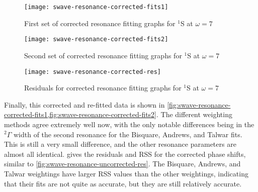 \documentclass[Dissertation.tex]{subfiles}
\begin{document}
\begin{figure}
	\centering
	\texttt{[image: swave-resonance-corrected-fits1]}
	\caption{First set of corrected resonance fitting graphs for $^1$S at $\omega = 7$}
	\label{fig:swave-resonance-corrected-fits1}
\end{figure}

\begin{figure}
	\centering
	\texttt{[image: swave-resonance-corrected-fits2]}
	\caption{Second set of corrected resonance fitting graphs for $^1$S at $\omega = 7$}
	\label{fig:swave-resonance-corrected-fits2}
\end{figure}

\begin{figure}
	\centering
	\texttt{[image: swave-resonance-corrected-res]}
	\caption{Residuals for corrected resonance fitting graphs for $^1$S at $\omega = 7$}
	\label{fig:swave-resonance-corrected-res}
\end{figure}

Finally, this corrected and re-fitted data is shown in
\cref{fig:swave-resonance-corrected-fits1,fig:swave-resonance-corrected-fits2}. The different 
weighting methods agree extremely well now, with the only notable differences 
being in the $^2\Gamma$ width of the second resonance for the Bisquare, 
Andrews, and Talwar fits. This is still a very small difference, and the 
other resonance parameters are almost all identical.
 gives the residuals and RSS for the corrected phase
shifts, similar to \cref{fig:swave-resonance-uncorrected-res}. The Bisquare, Andrews, 
and Talwar weightings have larger RSS values than the other weightings, 
indicating that their fits are not quite as accurate, but they are still 
relatively accurate.
\end{document}
